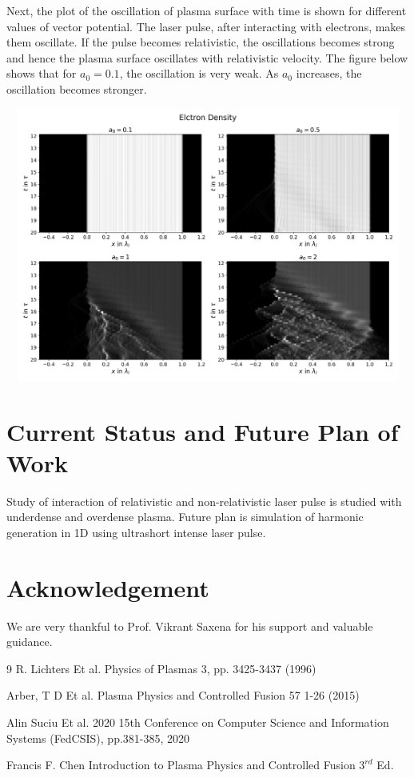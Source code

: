 \documentclass[12pt]{article}
\newenvironment{changemargin}[2]{%
\begin{list}{}{%
\setlength{\topsep}{0pt}%
\setlength{\leftmargin}{#1}%
\setlength{\rightmargin}{#2}%
\setlength{\listparindent}{\parindent}%
\setlength{\itemindent}{\parindent}%
\setlength{\parsep}{\parskip}%
}%
\item[]}{\end{list}}
\begin{document}
\begin{changemargin}{-3cm}{-3cm}
    Next, the plot of the oscillation of plasma surface with time is shown for different values of vector potential. The laser pulse, after interacting with electrons, makes them oscillate. If the pulse becomes relativistic, the oscillations becomes strong and hence the plasma surface oscillates with relativistic velocity.
    The figure below shows that for $a_0=0.1$, the oscillation is very weak. As $a_0$ increases, the oscillation becomes stronger.
    \noindent
    \begin{center}
        \includegraphics[height=9cm, width=16cm]{density.png}

    \end{center}
    \section{Current Status and Future Plan of Work}
    Study of interaction of relativistic and non-relativistic laser pulse is studied with underdense and overdense plasma. Future plan is simulation of harmonic generation in 1D using ultrashort intense laser pulse.
    \section{Acknowledgement}
    We are very thankful to Prof. Vikrant Saxena for his support and valuable guidance.
    \begin{thebibliography}{9}
        R. Lichters Et al. Physics of Plasmas 3, pp. 3425-3437 (1996)

        Arber, T D Et al. Plasma Physics and Controlled Fusion 57 1-26 (2015)

        Alin Suciu Et al. 2020 15th Conference on Computer Science and Information Systems (FedCSIS), pp.381-385, 2020

        Francis F. Chen
        Introduction to Plasma Physics and Controlled Fusion $3^{rd}$ Ed.

    \end{thebibliography}

\end{changemargin}
\end{document}

